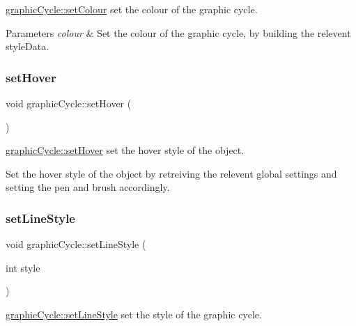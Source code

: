 \mbox{\hyperlink{classgraphic_cycle_a48965c220e8fad0181f1f793c17fb73c}{graphic\+Cycle\+::set\+Colour}} set the colour of the graphic cycle. 


\begin{DoxyParams}{Parameters}
{\em colour} & Set the colour of the graphic cycle, by building the relevent style\+Data. \\
\hline
\end{DoxyParams}
\mbox{\label{classgraphic_cycle_a54708026fc7ea647f431263990872cdf}} 
\subsubsection{\texorpdfstring{set\+Hover}{setHover}}
{\footnotesize\ttfamily void graphic\+Cycle\+::set\+Hover (\begin{DoxyParamCaption}{ }\end{DoxyParamCaption})\hspace{0.3cm}{\ttfamily [slot]}}



\mbox{\hyperlink{classgraphic_cycle_a54708026fc7ea647f431263990872cdf}{graphic\+Cycle\+::set\+Hover}} set the hover style of the object. 

Set the hover style of the object by retreiving the relevent global settings and setting the pen and brush accordingly. \mbox{\label{classgraphic_cycle_a96f1a1d6c958bfba3789a13c156f9795}} 
\subsubsection{\texorpdfstring{set\+Line\+Style}{setLineStyle}}
{\footnotesize\ttfamily void graphic\+Cycle\+::set\+Line\+Style (\begin{DoxyParamCaption}\item[{int}]{style }\end{DoxyParamCaption})\hspace{0.3cm}{\ttfamily [slot]}}



\mbox{\hyperlink{classgraphic_cycle_a96f1a1d6c958bfba3789a13c156f9795}{graphic\+Cycle\+::set\+Line\+Style}} set the style of the graphic cycle. 


